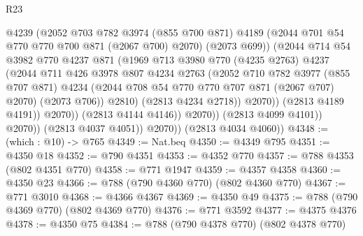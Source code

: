 \begin{lexlean}{R23}
\begin{coremodule}
                                @4239
                                (@2052
                                  @703
                                  @782
                                  @3974
                                  (@855 @700 @871)
                                  @4189
                                  (@2044 @701 @54 @770 @770 @700 @871 (@2067 @700) @2070)
                                  (@2073 @699))
                                (@2044
                                  @714
                                  @54
                                  @3982
                                  @770
                                  @4237
                                  @871
                                  (@1969
                                    @713
                                    @3980
                                    @770
                                    (@4235 @2763)
                                    @4237
                                    (@2044
                                      @711
                                      @426
                                      @3978
                                      @807
                                      @4234
                                      @2763
                                      (@2052
                                        @710
                                        @782
                                        @3977
                                        (@855 @707 @871)
                                        @4234
                                        (@2044 @708 @54 @770 @770 @707 @871 (@2067 @707) @2070)
                                        (@2073 @706))
                                      @2810)
                                    (@2813 @4234 @2718))
                                  @2070))
                              (@2813 @4189 @4191))
                            @2070))
                        (@2813 @4144 @4146))
                      @2070))
                  (@2813 @4099 @4101))
                @2070))
            (@2813 @4037 @4051))
          @2070))
      (@2813 @4034 @4060))
@4348 := (which : @10) -> @765
@4349 := Nat.beq
@4350 := @4349 @795
@4351 := @4350 @18
@4352 := @790 @4351
@4353 := @4352 @770
@4357 := @788 @4353 (@802 @4351 @770)
@4358 := @771 @1947
@4359 := @4357 @4358
@4360 := @4350 @23
@4366 := @788 (@790 @4360 @770) (@802 @4360 @770)
@4367 := @771 @3010
@4368 := @4366 @4367
@4369 := @4350 @49
@4375 := @788 (@790 @4369 @770) (@802 @4369 @770)
@4376 := @771 @3592
@4377 := @4375 @4376
@4378 := @4350 @75
@4384 := @788 (@790 @4378 @770) (@802 @4378 @770)

\end{coremodule}
\end{lexlean}
